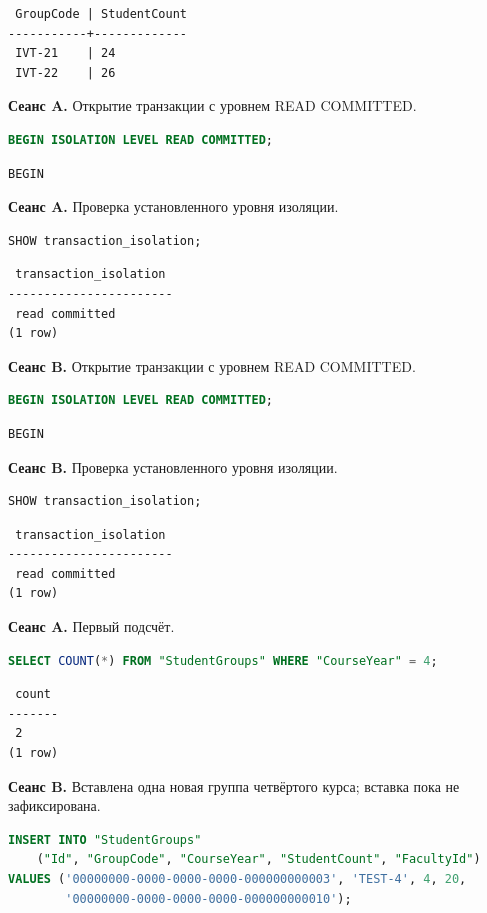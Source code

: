 \documentclass[12pt,a4paper]{article}
\begin{document}
\begin{lstlisting}
 GroupCode | StudentCount
-----------+-------------
 IVT-21    | 24
 IVT-22    | 26
\end{lstlisting}

\textbf{Сеанс A.} Открытие транзакции с уровнем READ COMMITTED.
\begin{lstlisting}[language=SQL]
BEGIN ISOLATION LEVEL READ COMMITTED;
\end{lstlisting}

\begin{lstlisting}
BEGIN
\end{lstlisting}

\textbf{Сеанс A.} Проверка установленного уровня изоляции.
\begin{lstlisting}[language=SQL]
SHOW transaction_isolation;
\end{lstlisting}

\begin{lstlisting}
 transaction_isolation
-----------------------
 read committed
(1 row)
\end{lstlisting}

\textbf{Сеанс B.} Открытие транзакции с уровнем READ COMMITTED.
\begin{lstlisting}[language=SQL]
BEGIN ISOLATION LEVEL READ COMMITTED;
\end{lstlisting}

\begin{lstlisting}
BEGIN
\end{lstlisting}

\textbf{Сеанс B.} Проверка установленного уровня изоляции.
\begin{lstlisting}[language=SQL]
SHOW transaction_isolation;
\end{lstlisting}

\begin{lstlisting}
 transaction_isolation
-----------------------
 read committed
(1 row)
\end{lstlisting}

\textbf{Сеанс A.} Первый подсчёт.
\begin{lstlisting}[language=SQL]
SELECT COUNT(*) FROM "StudentGroups" WHERE "CourseYear" = 4;
\end{lstlisting}

\begin{lstlisting}
 count
-------
 2
(1 row)
\end{lstlisting}

\textbf{Сеанс B.} Вставлена одна новая группа четвёртого курса; вставка пока не зафиксирована.
\begin{lstlisting}[language=SQL]
INSERT INTO "StudentGroups"
    ("Id", "GroupCode", "CourseYear", "StudentCount", "FacultyId")
VALUES ('00000000-0000-0000-0000-000000000003', 'TEST-4', 4, 20,
        '00000000-0000-0000-0000-000000000010');
\end{lstlisting}
\end{document}
